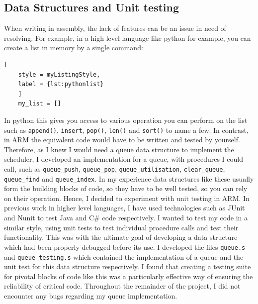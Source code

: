 \subsection{Data Structures and Unit testing}
When writing in assembly, the lack of features can be an issue in need of resolving. For example, in a high level language like python for example, you can create a list in memory by a single command: 


\begin{lstlisting}[
	style = myListingStyle,
	label = {lst:pythonlist}
	]
	my_list = []
\end{lstlisting}

In python this gives you access to various operation you can perform on the list such as \verb|append()|, \verb|insert|, \verb|pop()|, \verb|len()| and  \verb|sort()| to name a few. In contrast, in ARM the equivalent code would have to be written and tested by yourself. Therefore, as I knew I would need a queue data structure to implement the scheduler, I developed an implementation for a queue, with procedures I could call,
 such as \verb|queue_push|, \verb|queue_pop|, \verb|queue_utilisation|, \verb|clear_queue|, \verb|queue_find| and \verb|queue_index|. In my experience data structures like these usually form the building blocks of code, so they have to be well tested, so you can rely on their operation. Hence, I decided to experiment with unit testing in ARM. In previous work in higher level languages, I have used technologies such as JUnit \cite{junit} and Nunit \cite{nunit} to test Java \cite{java} and C\# \cite{csharp} code respectively.  I wanted to test my code in a similar style, using unit tests to test individual procedure calls and test their functionality. This was with the ultimate goal of developing a data structure which had been properly debugged before its use. I developed the files \verb|queue.s| and \verb|queue_testing.s| which contained the implementation of a queue and the unit test for this data structure respectively. I found that creating a testing suite for pivotal blocks of code like this was a particularly effective way of ensuring the reliability of critical code. Throughout the remainder of the project, I did not encounter any bugs regarding my queue implementation. 






















